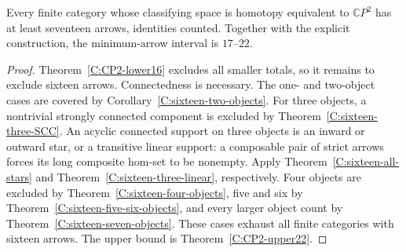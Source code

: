\begin{theorem}
\label{C:CP2-lower17}
Every finite category whose classifying space is homotopy
equivalent to $\mathbb CP^2$ has at least seventeen arrows,
identities counted.  Together with the explicit construction,
the minimum-arrow interval is $17$--$22$.
\end{theorem}
\begin{proof}
Theorem~\ref{C:CP2-lower16} excludes all smaller totals,
so it remains to exclude sixteen arrows.  Connectedness
is necessary.  The one- and two-object cases are covered
by Corollary~\ref{C:sixteen-two-objects}.
For three objects, a nontrivial strongly connected
component is excluded by
Theorem~\ref{C:sixteen-three-SCC}.  An acyclic connected
support on three objects is an inward or outward star,
or a transitive linear support: a composable pair of
strict arrows forces its long composite hom-set to be
nonempty.  Apply Theorem~\ref{C:sixteen-all-stars} and
Theorem~\ref{C:sixteen-three-linear}, respectively.
Four objects are excluded by
Theorem~\ref{C:sixteen-four-objects}, five and six by
Theorem~\ref{C:sixteen-five-six-objects}, and every larger
object count by Theorem~\ref{C:sixteen-seven-objects}.
These cases exhaust all finite categories with sixteen
arrows.  The upper bound is Theorem~\ref{C:CP2-upper22}.
\end{proof}
